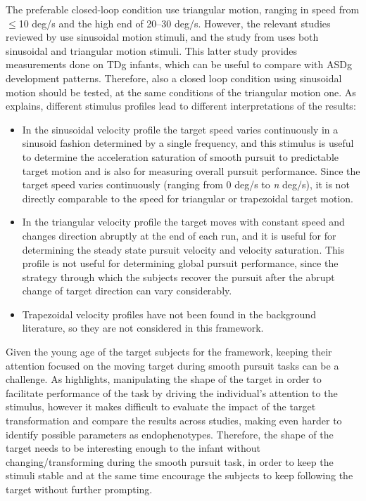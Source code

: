 The preferable closed-loop condition use triangular motion, ranging in speed from \(\leq\)10 deg/s and the high end of 20–30 deg/s. However, the relevant studies reviewed by \cite{johnson2016review} use sinusoidal motion stimuli, and the study from \cite{vonhofsten1997smoothpursuit} uses both sinusoidal and triangular motion stimuli. This latter study provides measurements done on TDg infants, which can be useful to compare with ASDg development patterns. Therefore, also a closed loop condition using sinusoidal motion should be tested, at the same conditions of the triangular motion one. As \cite{smyrnis2008guidelines} explains, different stimulus profiles lead to different interpretations of the results:
\begin{itemize}
    \item In the sinusoidal velocity profile the target speed varies continuously in a sinusoid fashion determined by a single frequency, and this stimulus is useful to determine the acceleration saturation of smooth pursuit to predictable target motion and is also for measuring overall pursuit performance. Since the target speed varies continuously (ranging from 0 deg/s to \textit{n} deg/s), it is not directly comparable to the speed for triangular or trapezoidal target motion.
    \item In the triangular velocity profile the target moves with constant speed and changes direction abruptly at the end of each run, and it is useful for for determining the steady state pursuit velocity and velocity saturation. This profile is not useful for determining global pursuit performance, since the strategy through which the subjects recover the pursuit after the abrupt change of target direction can vary considerably.
    \item Trapezoidal velocity profiles have not been found in the background literature, so they are not considered in this framework.
\end{itemize}

Given the young age of the target subjects for the framework, keeping their attention focused on the moving target during smooth pursuit tasks can be a challenge. As \cite{smyrnis2008guidelines} highlights, manipulating the shape of the target in order to facilitate performance of the task by driving the individual’s attention to the stimulus, however it makes difficult to evaluate the impact of the target transformation and compare the results across studies, making even harder to identify possible parameters as endophenotypes. Therefore, the shape of the target needs to be interesting enough to the infant without changing/transforming during the smooth pursuit task, in order to keep the stimuli stable and at the same time encourage the subjects to keep following the target without further prompting.


